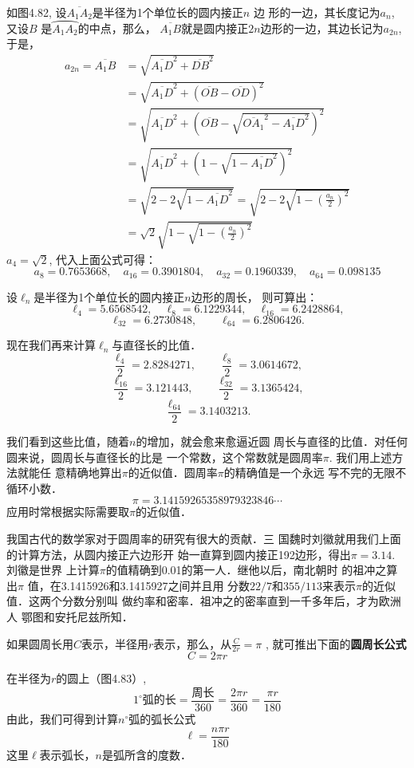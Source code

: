 如图4.82, 设$\overline{A_1A_2}$是半径为1个单位长的圆内接正$n$
边
形的一边，其长度记为$a_n$, 又设$B$
是$\wideparen{A_1A_2}$的中点，那么，
$\overline{A_1B}$就是圆内接正$2n$边形的一边，其边长记为$a_{2n}$, 于是，
\[\begin{split}
a_{2n}=\overline{A_1B}&=\sqrt{\overline{A_1D}^2+\overline{DB}^2}\\
&=\sqrt{\overline{A_1D}^2+\left(\overline{OB}-\overline{OD}\right)^2}\\
&=\sqrt{\overline{A_1D}^2+\left(\overline{OB}-\sqrt{\overline{OA_1}^2-\overline{A_1D}^2}\right)^2}\\
&=\sqrt{\overline{A_1D}^2+\left(1-\sqrt{1-\overline{A_1D}^2}\right)^2}\\
&=\sqrt{2-2\sqrt{1-\overline{A_1D}^2}}=\sqrt{2-2\sqrt{1-\left(\frac{a_n}{2}\right)^2}}\\
&=\sqrt{2}\sqrt{1-\sqrt{1-\left(\frac{a_n}{2}\right)^2}}
\end{split}\]
$a_4=\sqrt{2}$, 代入上面公式可得：
\[a_8=0.7653668,\quad a_{16}=0.3901804,\quad
a_{32}=0.1960339,\quad a_{64}=0.098135\]

设$\ell_n$是半径为1个单位长的圆内接正$n$边形的周长，
则可算出：
\[\ell_4=5.6568542,\quad \ell_8=6.1229344,\quad 
\ell_{16}=6.2428864,\]
\[\ell_{32}=6.2730848,\qquad \ell_{64}=6.2806426.\]

现在我们再来计算$\ell_n$与直径长的比值．
\[\frac{\ell_4}{2}=2.8284271,\qquad \frac{\ell_8}{2}=3.0614672,\]
\[\frac{\ell_{16}}{2}=3.121443,\qquad \frac{\ell_{32}}{2}=3.1365424,\]
\[\frac{\ell_{64}}{2}=3.1403213.\]

我们看到这些比值，随着$n$的增加，就会愈来愈逼近圆
周长与直径的比值．对任何圆来说，圆周长与直径长的比是
一个常数，这个常数就是圆周率$\pi$. 我们用上述方法就能任
意精确地算出$\pi$的近似值．圆周率$\pi$的精确值是一个永远
写不完的无限不循环小数．
\[\pi=3.14159265358979323846\cdots\]
应用时常根据实际需要取$\pi$的近似值．

我国古代的数学家对于圆周率的研究有很大的贡献．三
国魏时刘徽就用我们上面的计算方法，从圆内接正六边形开
始一直算到圆内接正192边形，得出$\pi=3.14$. 刘徽是世界
上计算$\pi$的值精确到0.01的第一人．继他以后，南北朝时
的祖冲之算出$\pi$
值，在3.1415926和3.1415927之间并且用
分数$22/7$和$355/113$来表示$\pi$的近似值．这两个分数分别叫
做约率和密率．祖冲之的密率直到一千多年后，才为欧洲人
鄂图和安托尼兹所知．

如果圆周长用$C$表示，半径用$r$表示，那么，从$\frac{C}{2r}=\pi$
, 就可推出下面的\textbf{圆周长公式}
\[C=2\pi r\]

在半径为$r$的圆上（图4.83）,
\[1^{\circ}\text{弧的长}=\frac{\text{周长}}{360}=\frac{2\pi r}{360}=\frac{\pi r}{180}\]
由此，我们可得到计算$n^{\circ}$弧的弧长公式
\[\ell=\frac{n\pi r}{180}\]
这里$\ell$表示弧长，$n$是弧所含的度数．

